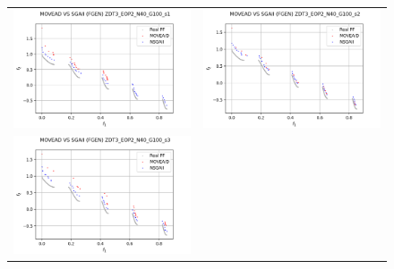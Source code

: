 \begin{figure}[H]
    \centering
    \begin{tabular}{c c}
    \includegraphics[scale=0.5]{figures/ZDT3_EOP2_N40_G100_T6/s1_comp.png} &
    \includegraphics[scale=0.5]{figures/ZDT3_EOP2_N40_G100_T6/s2_comp.png}\\
    \includegraphics[scale=0.5]{figures/ZDT3_EOP2_N40_G100_T6/s3_comp.png} &

\end{tabular}
\end{figure}
